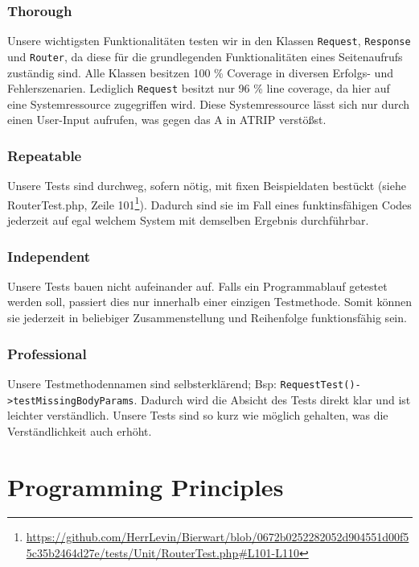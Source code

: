 \documentclass[12pt,a4paper,titlepage,ngerman,pdftex]{report}
\begin{document}
    \subsubsection{Thorough}
    Unsere wichtigsten Funktionalitäten testen wir in den Klassen \verb|Request|, \verb|Response| und \verb|Router|, da diese für die grundlegenden Funktionalitäten eines Seitenaufrufs zuständig sind.
    Alle Klassen besitzen 100 \% Coverage in diversen Erfolgs- und Fehlerszenarien. Lediglich \verb|Request| besitzt nur 96 \% line coverage, da hier auf eine Systemressource zugegriffen wird.
    Diese Systemressource lässt sich nur durch einen User-Input aufrufen, was gegen das A in ATRIP verstößst.

    \subsubsection{Repeatable}
    Unsere Tests sind durchweg, sofern nötig, mit fixen Beispieldaten bestückt (siehe RouterTest.php, Zeile 101\footnote{\url{https://github.com/HerrLevin/Bierwart/blob/0672b0252282052d904551d00f55c35b2464d27e/tests/Unit/RouterTest.php\#L101-L110}}).
    Dadurch sind sie im Fall eines funktinsfähigen Codes jederzeit auf egal welchem System mit demselben Ergebnis durchführbar.

    \subsubsection{Independent}
    Unsere Tests bauen nicht aufeinander auf.
    Falls ein Programmablauf getestet werden soll, passiert dies nur innerhalb einer einzigen Testmethode.
    Somit können sie jederzeit in beliebiger Zusammenstellung und Reihenfolge funktionsfähig sein.

    \subsubsection{Professional}
    Unsere Testmethodennamen sind selbsterklärend; Bsp: \verb|RequestTest()->testMissingBodyParams|.
    Dadurch wird die Absicht des Tests direkt klar und ist leichter verständlich.
    Unsere Tests sind so kurz wie möglich gehalten, was die Verständlichkeit auch erhöht.

    \section{Programming Principles}
    \label{sec:programmingprinciples}
\end{document}
